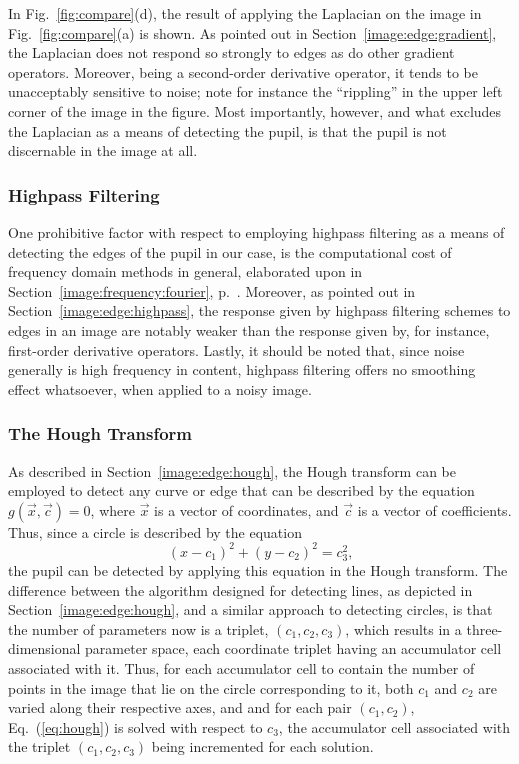 In Fig.~\ref{fig:compare}(d), the result of applying the Laplacian on
the image in Fig.~\ref{fig:compare}(a) is shown.  As pointed out in
Section~\ref{image:edge:gradient}, the Laplacian does not respond so
strongly to edges as do other gradient operators.  Moreover, being a
second-order derivative operator, it tends to be unacceptably
sensitive to noise; note for instance the ``rippling'' in the upper
left corner of the image in the figure.  Most importantly, however,
and what excludes the Laplacian as a means of detecting the pupil, is
that the pupil is not discernable in the image at all.

\subsubsection{Highpass Filtering}

One prohibitive factor with respect to employing highpass filtering as
a means of detecting the edges of the pupil in our case, is the
computational cost of frequency domain methods in general, elaborated
upon in Section~\ref{image:frequency:fourier}, p.~\pageref{pg:fft:O}.
Moreover, as pointed out in Section~\ref{image:edge:highpass}, the
response given by highpass filtering schemes to edges in an image are
notably weaker than the response given by, for instance, first-order
derivative operators.  Lastly, it should be noted that, since noise
generally is high frequency in content, highpass filtering offers no
smoothing effect whatsoever, when applied to a noisy image.

\subsubsection{The Hough Transform}

As described in Section~\ref{image:edge:hough}, the Hough transform
can be employed to detect any curve or edge that can be described by
the equation $g(\vec{x},\vec{c})=0$, where $\vec{x}$ is a vector of
coordinates, and $\vec{c}$ is a vector of coefficients.  Thus, since a
circle is described by the equation
\begin{equation}
\label{eq:hough}
  (x-c_{1})^{2}+(y-c_{2})^{2}=c_{3}^{2}\mbox{,}
\end{equation}
the pupil can be detected by applying this equation in the Hough
transform.  The difference between the algorithm designed for
detecting lines, as depicted in Section~\ref{image:edge:hough}, and a
similar approach to detecting circles, is that the number of
parameters now is a triplet, $(c_{1},c_{2},c_{3})$, which results in a
three-dimensional parameter space, each coordinate triplet having an
accumulator cell associated with it.  Thus, for each accumulator cell
to contain the number of points in the image that lie on the circle
corresponding to it, both $c_{1}$ and $c_{2}$ are varied along their
respective axes, and and for each pair $(c_{1},c_{2})$,
Eq.~(\ref{eq:hough}) is solved with respect to $c_{3}$, the
accumulator cell associated with the triplet $(c_{1},c_{2},c_{3})$
being incremented for each solution.

